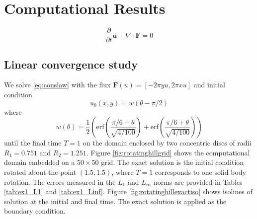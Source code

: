 \section{Computational Results}\label{sec:compResults}
\begin{equation} \label{eq:conslaw}
   \frac{\partial}{\partial t} \mathbf{u} + \nabla \cdot \mathbf{F} = 0
\end{equation}
\subsection{Linear convergence study}
We solve \eqref{eq:conslaw} with the flux $\mathbf{F}(u) = [-2\pi y u, 2\pi x u]$ and initial condition
$$
u_0(x,y) = w(\theta - \pi/2)
$$
where
$$
w(\theta) = \frac{1}{2}\left( \text{erf}\left( \frac{\pi/6 - \theta}{\sqrt{4/100}} \right) + \text{erf}\left( \frac{\pi/6 + \theta}{\sqrt{4/100}} \right)\right)
$$
until the final time $T = 1$ on the domain enclosed by two concentric discs of radii $R_1 = 0.751$ and $R_2 = 1.251$.  Figure \ref{fig:rotatinghillgrid} shows the computational domain embedded on a $50 \times 50$ grid.  The exact solution is the initial condition rotated about the point $(1.5,1.5)$, where $T=1$ corresponds to one solid body rotation.  The errors measured in the $L_1$ and $L_\infty$ norms are provided in Tables \ref{tab:ex1_L1} and \ref{tab:ex1_Linf}.
Figure
\ref{fig:rotatinghillexactiso} shows isolines of solution at the initial and final time.  The exact solution is applied as the boundary condition.


